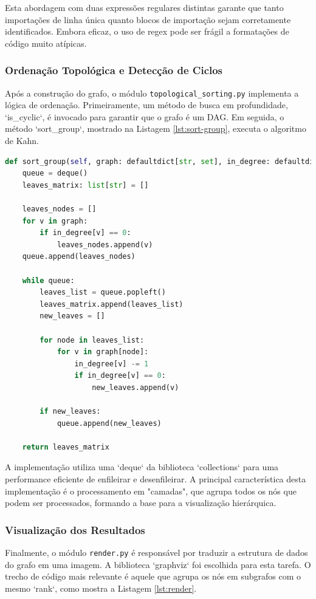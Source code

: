 \documentclass[12pt]{article}
\begin{document}
Esta abordagem com duas expressões regulares distintas garante que tanto importações de linha única quanto blocos de importação sejam corretamente identificados. Embora eficaz, o uso de regex pode ser frágil a formatações de código muito atípicas.

\subsubsection{Ordenação Topológica e Detecção de Ciclos}
Após a construção do grafo, o módulo \texttt{topological\_sorting.py} implementa a lógica de ordenação. Primeiramente,
um método de busca em profundidade, `is{\_}cyclic`, é invocado para garantir que o grafo é um DAG. Em seguida, o método
`sort{\_}group`, mostrado na Listagem \ref{lst:sort-group}, executa o algoritmo de Kahn.

\begin{lstlisting}[language=Python, caption={Trecho do código de ordenação topológica (Kahn).}, label={lst:sort-group}]
def sort_group(self, graph: defaultdict[str, set], in_degree: defaultdict[str, int]) -> list[str]:
    queue = deque()
    leaves_matrix: list[str] = []

    leaves_nodes = []
    for v in graph:
        if in_degree[v] == 0:
            leaves_nodes.append(v)
    queue.append(leaves_nodes)

    while queue:
        leaves_list = queue.popleft()
        leaves_matrix.append(leaves_list)
        new_leaves = []

        for node in leaves_list:
            for v in graph[node]:
                in_degree[v] -= 1
                if in_degree[v] == 0:
                    new_leaves.append(v)

        if new_leaves:
            queue.append(new_leaves)

    return leaves_matrix
\end{lstlisting}

A implementação utiliza uma `deque` da biblioteca `collections` para uma performance eficiente de enfileirar e desenfileirar. A principal característica desta implementação é o processamento em "camadas", que agrupa todos os nós que podem ser processados, formando a base para a visualização hierárquica.

\subsubsection{Visualização dos Resultados}
Finalmente, o módulo \texttt{render.py} é responsável por traduzir a estrutura de dados do grafo em uma imagem. A biblioteca `graphviz` \cite{graphviz} foi escolhida para esta tarefa. O trecho de código mais relevante é aquele que agrupa os nós em subgrafos com o mesmo `rank`, como mostra a Listagem \ref{lst:render}.
\end{document}
